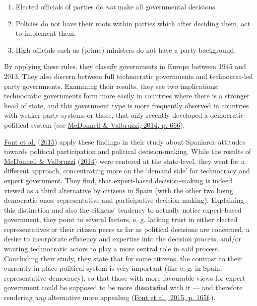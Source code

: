 \documentclass[
  12pt,
  english,
]{article}
\providecommand{\tightlist}{%
  \setlength{\itemsep}{0pt}\setlength{\parskip}{0pt}}
\begin{document}
\begin{enumerate}
\def\labelenumi{\arabic{enumi}.}
\tightlist
\item
  Elected officials of parties do \emph{not} make all governmental
  decisions.
\item
  Policies do not have their roots within parties which after deciding
  them, act to implement them.
\item
  High officials such as (prime) ministers do not have a party
  background.
\end{enumerate}

By applying these rules, they classify governments in Europe between
1945 and 2013. They also discern between full technocratic governments
and technocrat-led party governments. Examining their results, they see
two implications: technocratic governments form more easily in countries
where there is a stronger head of state, and this government type is
more frequently observed in countries with weaker party systems or
those, that only recently developed a democratic political system (see
\protect\hyperlink{ref-mcdonnell2014defining}{McDonnell \& Valbruzzi,
2014, p. 666}).

\protect\hyperlink{ref-font2015participation}{Font et al.}
(\protect\hyperlink{ref-font2015participation}{2015}) apply these
findings in their study about Spaniards attitudes towards political
participation and political decision-making. While the results of
\protect\hyperlink{ref-mcdonnell2014defining}{McDonnell \& Valbruzzi}
(\protect\hyperlink{ref-mcdonnell2014defining}{2014}) were centered at
the state-level, they went for a different approach, concentrating more
on the `demand side' for technocracy and expert government. They find,
that expert-based decision-making is indeed viewed as a third
alternative by citizens in Spain (with the other two being democratic
ones: representative and participative decision-making). Explaining this
distinction and also the citizens' tendency to actually notice
expert-based government, they point to several factors, e. g. lacking
trust in either elected representatives or their citizen peers as far as
political decisions are concerned, a desire to incorporate efficiency
and expertise into the decision process, and/or wanting technocratic
actors to play a more central role in said process. Concluding their
study, they state that for some citizens, the contrast to their
currently in-place political system is very important (like e. g. in
Spain, representative democracy), so that those with more favourable
views for expert government could be supposed to be more dissatisfied
with it --- and therefore rendering \emph{any} alternative more
appealing (\protect\hyperlink{ref-font2015participation}{Font et al.,
2015, p. 165f}.).
\end{document}
